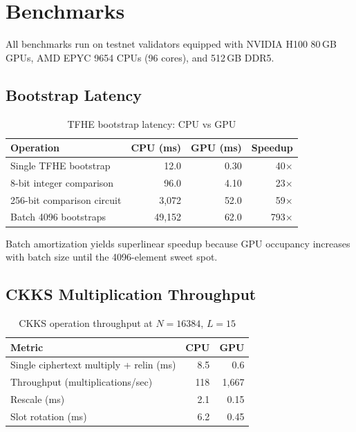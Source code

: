 \section{Benchmarks}

\label{sec:bench}

All benchmarks run on \Zoo{} testnet validators equipped with NVIDIA H100 80\,GB GPUs, AMD EPYC 9654 CPUs (96 cores), and 512\,GB DDR5.

\subsection{Bootstrap Latency}

\begin{table}[h]
\centering
\begin{tabular}{lrrr}
\toprule
\textbf{Operation} & \textbf{CPU (ms)} & \textbf{GPU (ms)} & \textbf{Speedup} \\
\midrule
Single TFHE bootstrap & 12.0 & 0.30 & 40$\times$ \\
8-bit integer comparison & 96.0 & 4.10 & 23$\times$ \\
256-bit comparison circuit & 3{,}072 & 52.0 & 59$\times$ \\
Batch 4096 bootstraps & 49{,}152 & 62.0 & 793$\times$ \\
\bottomrule
\end{tabular}
\caption{TFHE bootstrap latency: CPU vs GPU}
\label{tab:bootstrap}
\end{table}

Batch amortization yields superlinear speedup because GPU occupancy increases with batch size until the 4096-element sweet spot.

\subsection{CKKS Multiplication Throughput}

\begin{table}[h]
\centering
\begin{tabular}{lrr}
\toprule
\textbf{Metric} & \textbf{CPU} & \textbf{GPU} \\
\midrule
Single ciphertext multiply + relin (ms) & 8.5 & 0.6 \\
Throughput (multiplications/sec) & 118 & 1{,}667 \\
Rescale (ms) & 2.1 & 0.15 \\
Slot rotation (ms) & 6.2 & 0.45 \\
\bottomrule
\end{tabular}
\caption{CKKS operation throughput at $N = 16384$, $L = 15$}
\label{tab:ckks}
\end{table}

